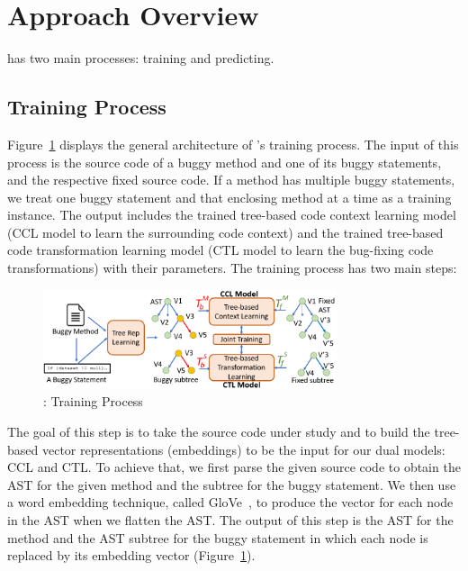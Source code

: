 \section{Approach Overview}
\label{overview:sec}

{\tool} has two main processes: training and predicting.

\subsection{Training Process}

Figure~\ref{overview-training} displays the general architecture of
{\tool}'s training process. The input of this process is the
source code of a buggy method and one of its buggy statements, and the
respective fixed source code. 
If a method has multiple buggy
statements, we treat one buggy statement and that enclosing method at
a time as a training instance. The output includes the trained
tree-based code context learning model (CCL model to learn the
surrounding code context) and the trained tree-based code
transformation learning model (CTL model to learn the
bug-fixing code transformations) with their parameters. The training
process has two main steps:

\begin{figure}[t]
	\centering
	\includegraphics[width=3.4in]{graphs/new_overview.png}
        \vspace{-15pt}
	\caption{{\tool}: Training Process}
	\label{overview-training}
	\vspace{-10pt}
\end{figure}

\vspace{3pt}
 The goal of this
step is to take the source code under study and to build the
tree-based vector representations (embeddings) to be the input for our
dual models: CCL and CTL. To achieve that, we first parse the given
source code to obtain the AST for the given method and the subtree for
the buggy statement.  We then use a word embedding technique, called
GloVe~\cite{pennington2014glove}, to produce the vector for each node
in the AST when we flatten the AST. The output of this step is the AST
for the method and the AST subtree for the buggy statement in which
each node is replaced by its embedding vector
(Figure~\ref{overview-training}).

